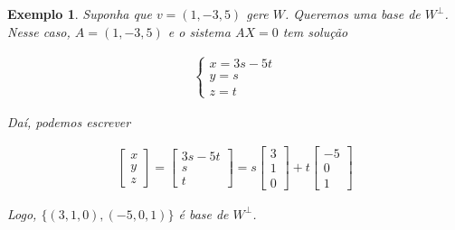 \documentclass{article}
\newtheorem*{example}{Exemplo}
\begin{document}
\begin{example}
	Suponha que $v = (1, -3, 5)$ gere $W$. Queremos uma base de $W^{\perp}$. Nesse caso, $A = (1, -3, 5)$ e o sistema $AX = 0$ tem solução
	
	\begin{align*}
	\begin{cases}
	x = 3s - 5t \\
	y = s \\
	z = t
	\end{cases}
	\end{align*}
	
	\par\vspace{0.3cm} Daí, podemos escrever
	
	\begin{align*}
	\begin{bmatrix}
	x\\
	y\\
	z
	\end{bmatrix} = \begin{bmatrix}
	3s - 5t \\
	s\\
	t
	\end{bmatrix} = s\begin{bmatrix}
	3\\
	1\\
	0
	\end{bmatrix} + t\begin{bmatrix}
	-5\\
	0\\
	1
	\end{bmatrix}
	\end{align*}
	
	\par\vspace{0.3cm} Logo, $\{(3, 1, 0), (-5, 0, 1)\}$ é base de $W^{\perp}$.
	
\end{example}
\end{document}
